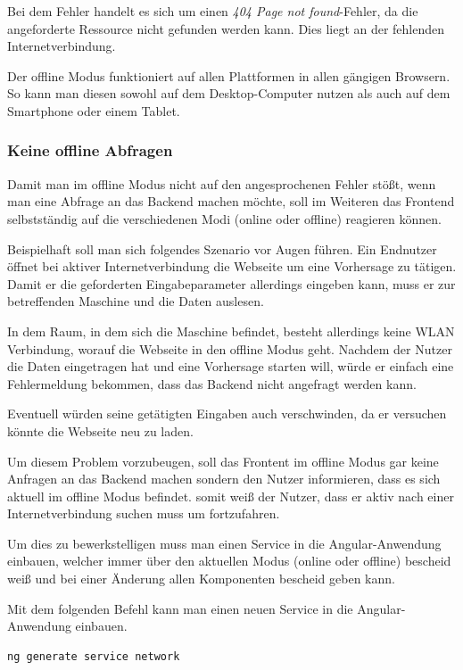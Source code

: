 Bei dem Fehler handelt es sich um einen \textit{404 Page not found}-Fehler, da die angeforderte Ressource nicht gefunden
werden kann. Dies liegt an der fehlenden Internetverbindung.

Der offline Modus funktioniert auf allen Plattformen in allen gängigen Browsern. So kann man diesen sowohl auf dem
Desktop-Computer nutzen als auch auf dem Smartphone oder einem Tablet.

\subsubsection{Keine offline Abfragen}
Damit man im offline Modus nicht auf den angesprochenen Fehler stößt, wenn man eine Abfrage an das Backend machen
möchte, soll im Weiteren das Frontend selbstständig auf die verschiedenen Modi (online oder offline) reagieren können.

Beispielhaft soll man sich folgendes Szenario vor Augen führen. Ein Endnutzer öffnet bei aktiver Internetverbindung die
Webseite um eine Vorhersage zu tätigen. Damit er die geforderten Eingabeparameter allerdings eingeben kann, muss er zur
betreffenden Maschine und die Daten auslesen.

In dem Raum, in dem sich die Maschine befindet, besteht allerdings keine WLAN Verbindung, worauf die Webseite in den
offline Modus geht. Nachdem der Nutzer die Daten eingetragen hat und eine Vorhersage starten will, würde er einfach
eine Fehlermeldung bekommen, dass das Backend nicht angefragt werden kann.

Eventuell würden seine getätigten Eingaben auch verschwinden, da er versuchen könnte die Webseite neu zu laden.

Um diesem Problem vorzubeugen, soll das Frontent im offline Modus gar keine Anfragen an das Backend machen sondern den
Nutzer informieren, dass es sich aktuell im offline Modus befindet. somit weiß der Nutzer, dass er aktiv nach einer
Internetverbindung suchen muss um fortzufahren.

Um dies zu bewerkstelligen muss man einen Service in die Angular-Anwendung einbauen, welcher immer über den aktuellen
Modus (online oder offline) bescheid weiß und bei einer Änderung allen Komponenten bescheid geben kann.

Mit dem folgenden Befehl kann man einen neuen Service in die Angular-Anwendung einbauen.

\begin{lstlisting}[caption=Hinzufügen eines Services, label=ls:umsetzung_angularaddservice]
    ng generate service network
\end{lstlisting}

